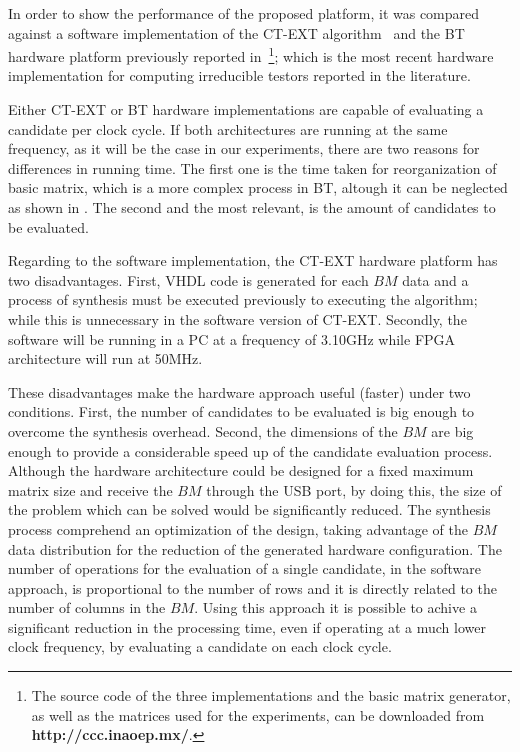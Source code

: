 \documentclass[authoryear,preprint,review,12pt]{elsarticle}
\begin{document}
In order to show the performance of the proposed platform, it was compared against a software 
implementation of the CT-EXT algorithm~\citep{R22} and the BT hardware platform previously 
reported in~\citep{Rod14}\footnote{The source code of the three implementations and the basic matrix
generator, as well as the matrices used for the experiments, can be downloaded from 
\textbf{http://ccc.inaoep.mx/}.}; which is the most recent hardware implementation for computing irreducible testors reported in the literature.
 

Either CT-EXT or BT hardware implementations are capable of evaluating a candidate per clock 
cycle. If both architectures are running at the same frequency, as it will be the case in our experiments, 
there are two reasons for differences in running time. The first one is the time taken for reorganization 
of basic matrix, which is a more complex process in BT, altough it can be neglected as shown in \citep{R21}. 
The second and the most relevant, is the amount of candidates to be evaluated. 

Regarding to the software implementation, the CT-EXT hardware platform has two disadvantages. First, 
VHDL code is generated for each $BM$ data and a process of synthesis must be executed previously to 
executing the algorithm; while this is unnecessary in the software version of CT-EXT. Secondly, the 
software will be running in a PC at a frequency of 3.10GHz while FPGA architecture will run at 50MHz. 

These disadvantages make the hardware approach useful (faster) under two conditions. First, the number of 
candidates to be evaluated is big enough to overcome the synthesis overhead. Second, the dimensions of the 
$BM$ are big enough to provide a considerable speed up of the candidate evaluation process. Although 
the hardware architecture could be designed for a fixed maximum matrix size and receive the $BM$ through the 
USB port, by doing this, the size of the problem which can be solved would be significantly reduced. The 
synthesis process comprehend an optimization of the design, taking advantage of the $BM$ data distribution for 
the reduction of the generated hardware configuration. The number of operations for the evaluation of a single 
candidate, in the software approach, is proportional to the number of rows and it is directly related to the 
number of columns in the $BM$. Using this approach it is possible to achive a significant reduction in the processing time, even if
operating at a much lower clock frequency, by evaluating a candidate on each clock cycle.
\end{document}

